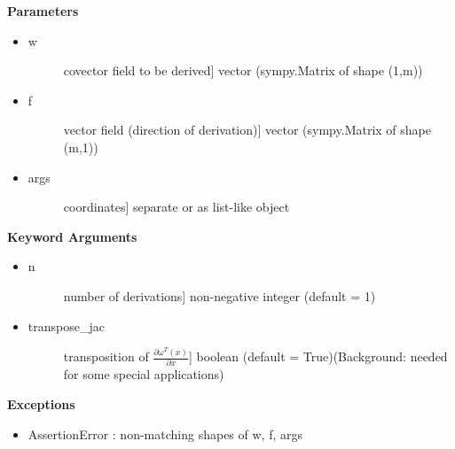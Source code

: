 \documentclass[letterpaper,10pt,english]{sphinxmanual}
\begin{document}
\begin{fulllineitems}
\textbf{Parameters}
\begin{itemize}
\item {} \begin{description}
\item[{w}] \leavevmode{[}covector field to be derived{]}
vector (sympy.Matrix of shape (1,m))

\end{description}

\item {} \begin{description}
\item[{f}] \leavevmode{[}vector field (direction of derivation){]}
vector (sympy.Matrix of shape (m,1))

\end{description}

\item {} \begin{description}
\item[{args}] \leavevmode{[}coordinates{]}
separate or as list-like object

\end{description}

\end{itemize}

\textbf{Keyword Arguments}
\begin{itemize}
\item {} \begin{description}
\item[{n}] \leavevmode{[}number of derivations{]}
non-negative integer (default = 1)

\end{description}

\item {} \begin{description}
\item[{transpose\_jac}] \leavevmode{[}transposition of $\frac{ \partial{\omega^T(x)} }{ \partial{x} }${]}
boolean (default = True)(Background: needed for some special applications)

\end{description}

\end{itemize}

\textbf{Exceptions}
\begin{itemize}
\item {} 
AssertionError : non-matching shapes of w, f, args

\end{itemize}


\end{fulllineitems}
\end{document}
